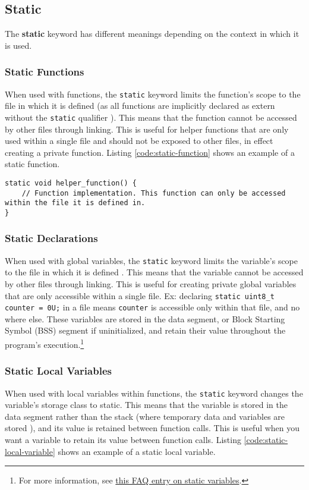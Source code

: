 \documentclass[main.tex]{subfiles}
\begin{document}
\subsection{Static}
The \textbf{static} keyword has different meanings depending on the context in which it is used.
\subsubsection{Static Functions}
When used with functions, the \texttt{static} keyword limits the function's scope to the file in which it is defined (as all functions are implicitly declared as extern without the \texttt{static} qualifier \cite{arm_static}). This means that the function cannot be accessed by other files through linking. This is useful for helper functions that are only used within a single file and should not be exposed to other files, in effect creating a private function. Listing \ref{code:static-function} shows an example of a static function.


\begin{lstlisting}[caption={Example of a Static Function}, label={code:static-function}]
static void helper_function() {
    // Function implementation. This function can only be accessed within the file it is defined in.
}
\end{lstlisting}

\subsubsection{Static Declarations}
When used with global variables, the \texttt{static} keyword limits the variable's scope to the file in which it is defined \cite{arm_static}. This means that the variable cannot be accessed by other files through linking. This is useful for creating private global variables that are only accessible within a single file. Ex: declaring \texttt{static uint8\_t counter = 0U;} in a file means \texttt{counter} is accessible only within that file, and no where else. These variables are stored in the data segment, or Block Starting Symbol (BSS) segment if uninitialized, and retain their value throughout the program's execution.\footnote{For more information, see \href{https://cosmic-software.com/faq/faq17.php}{this FAQ entry on static variables}.}


\subsubsection{Static Local Variables}
When used with local variables within functions, the \texttt{static} keyword changes the variable's storage class to static. This means that the variable is stored in the data segment rather than the stack (where temporary data and variables are stored \cite{embedded_com_Static}), and its value is retained between function calls. This is useful when you want a variable to retain its value between function calls. Listing \ref{code:static-local-variable} shows an example of a static local variable.


\end{document}
